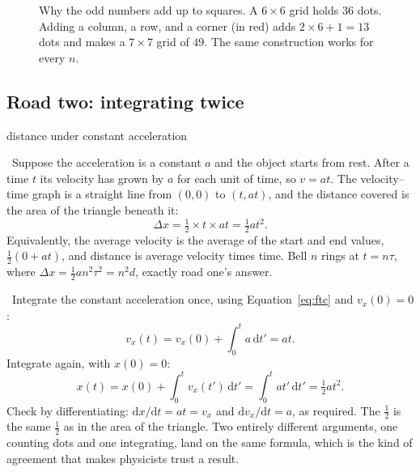 \documentclass[11pt,twoside,openany]{book}
\newcommand{\dd}{\mathrm{d}}
\newcommand{\viewtag}[3]{\fcolorbox{#2}{#3}{\footnotesize\textbf{\textcolor{#2}{#1}}}}
\newcommand{\elemtag}{\viewtag{Elementary}{elemcol}{elempale}}
\newcommand{\calctag}{\viewtag{Calculus}{calccol}{calcpale}}
\newcommand{\elem}{\par\medskip\noindent\elemtag\ }
\newcommand{\calc}{\par\medskip\noindent\calctag\ }
\begin{document}
\begin{figure}[htb]
\centering
{}
\caption{Why the odd numbers add up to squares. A $6\times 6$ grid holds $36$ dots. Adding a column, a row, and a corner (in red) adds $2\times 6 + 1 = 13$ dots and makes a $7\times 7$ grid of $49$. The same construction works for every $n$.}
\label{fig:grid}
\end{figure}

\subsection{Road two: integrating twice}

\begin{twoviews}{distance under constant acceleration}
\elem Suppose the acceleration is a constant $a$ and the object starts from rest. After a time $t$ its velocity has grown by $a$ for each unit of time, so $v = at$. The velocity--time graph is a straight line from $(0,0)$ to $(t, at)$, and the distance covered is the area of the triangle beneath it:
\[
\Delta x = \tfrac12 \times t \times at = \tfrac12 a t^2.
\]
Equivalently, the average velocity is the average of the start and end values, $\tfrac12(0 + at)$, and distance is average velocity times time. Bell $n$ rings at $t = n\tau$, where $\Delta x = \tfrac12 a n^2 \tau^2 = n^2 d$, exactly road one's answer.

\calc Integrate the constant acceleration once, using Equation~\eqref{eq:ftc} and $v_x(0) = 0$:
\begin{equation}
v_x(t) = v_x(0) + \int_0^t a\,\dd t' = a t.
\label{eq:vat}
\end{equation}
Integrate again, with $x(0) = 0$:
\begin{equation}
x(t) = x(0) + \int_0^t v_x(t')\,\dd t' = \int_0^t a t'\,\dd t' = \tfrac12 a t^2.
\label{eq:halfat2}
\end{equation}
Check by differentiating: $\dd x/\dd t = at = v_x$ and $\dd v_x/\dd t = a$, as required. The $\tfrac12$ is the same $\tfrac12$ as in the area of the triangle. Two entirely different arguments, one counting dots and one integrating, land on the same formula, which is the kind of agreement that makes physicists trust a result.
\end{twoviews}
\end{document}
